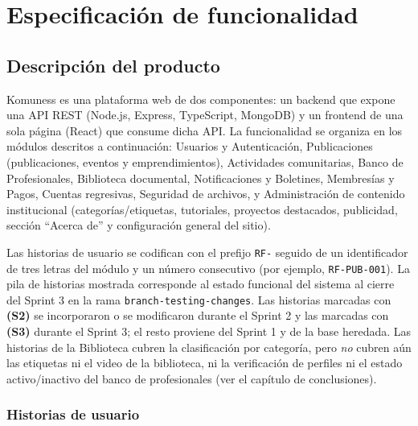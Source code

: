\chapter{Especificación de funcionalidad}
\section{Descripción del producto}
Komuness es una plataforma web de dos componentes: un backend que expone una API REST (Node.js, Express, TypeScript, MongoDB) y un frontend de una sola página (React) que consume dicha API. La funcionalidad se organiza en los módulos descritos a continuación: Usuarios y Autenticación, Publicaciones (publicaciones, eventos y emprendimientos), Actividades comunitarias, Banco de Profesionales, Biblioteca documental, Notificaciones y Boletines, Membresías y Pagos, Cuentas regresivas, Seguridad de archivos, y Administración de contenido institucional (categorías/etiquetas, tutoriales, proyectos destacados, publicidad, sección ``Acerca de'' y configuración general del sitio).

Las historias de usuario se codifican con el prefijo \texttt{RF-} seguido de un identificador de tres letras del módulo y un número consecutivo (por ejemplo, \texttt{RF-PUB-001}). La pila de historias mostrada corresponde al estado funcional del sistema al cierre del Sprint 3 en la rama \texttt{branch-testing-changes}. Las historias marcadas con \textbf{(S2)} se incorporaron o se modificaron durante el Sprint 2 y las marcadas con \textbf{(S3)} durante el Sprint 3; el resto proviene del Sprint 1 y de la base heredada. Las historias de la Biblioteca cubren la clasificación por categoría, pero \textit{no} cubren aún las etiquetas ni el video de la biblioteca, ni la verificación de perfiles ni el estado activo/inactivo del banco de profesionales (ver el capítulo de conclusiones).

\subsection{Historias de usuario}

